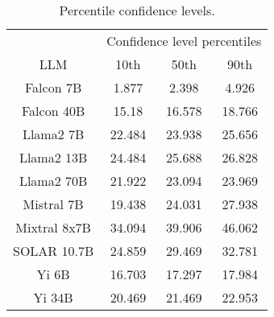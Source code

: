 \begin{table*}
\centering
\begin{tabular}{c|c|c|c}
& \multicolumn{3}{c}{Confidence level percentiles} \\ 
LLM & 10th & 50th & 90th\\ \hline
Falcon 7B & 1.877 & 2.398 & 4.926\\
Falcon 40B & 15.18 & 16.578 & 18.766\\
Llama2 7B & 22.484 & 23.938 & 25.656\\
Llama2 13B & 24.484 & 25.688 & 26.828\\
Llama2 70B & 21.922 & 23.094 & 23.969\\
Mistral 7B & 19.438 & 24.031 & 27.938\\
Mixtral 8x7B & 34.094 & 39.906 & 46.062\\
SOLAR 10.7B & 24.859 & 29.469 & 32.781\\
Yi 6B & 16.703 & 17.297 & 17.984\\
Yi 34B & 20.469 & 21.469 & 22.953\\
\hline
\end{tabular}
\caption{Percentile confidence levels.}
\label{tab:percentile_conf}
\end{table*}
